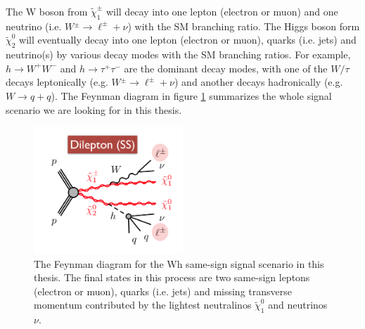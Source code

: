The W boson from $\tilde{\chi}_1^\pm$ will decay into one lepton (electron or muon) and one neutrino (i.e. $W{^\pm} \rightarrow \ell^{\pm} + \nu$) with the SM branching ratio.
The Higgs boson form $\tilde{\chi}_2^0$ will eventually decay into one lepton (electron or muon), quarks (i.e. jets) and neutrino(s) by various decay modes with the SM branching ratios.
For example, $h \rightarrow W^{+} W^{-} $ and $h \rightarrow \tau^{+} \tau^{-} $ are the dominant decay modes, with one of the $W / \tau$ decays leptonically (e.g. $W{^\pm} \rightarrow \ell^{\pm} + \nu$) and another decays hadronically (e.g. $W \rightarrow q + q$).
The Feynman diagram in figure \ref{fig:signal_feynman} summarizes the whole signal scenario we are looking for in this thesis.

\begin{figure}
\centering
\includegraphics[width=0.5\textwidth]{data/photo/theory/signal_feynman.png}
\caption{The Feynman diagram for the Wh same-sign signal scenario in this thesis. The final states in this process are two same-sign leptons (electron or muon), quarks (i.e. jets) and missing transverse momentum contributed by the lightest neutralinos $\tilde{\chi}_1^0$ and neutrinos $\nu$.}
\label{fig:signal_feynman}
\end{figure}

